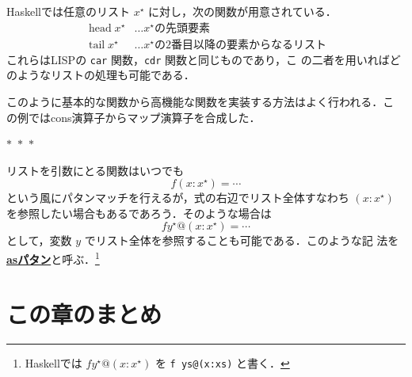 \documentclass[a5paper,twoside,fleqn,draft]{jsbook}
\newcommand{\separator}{\begin{center}$*$~$*$~$*$\end{center}}
\newcommand{\programminglanguage}[1]{\textsf{#1}}
\newcommand{\haskell}{\programminglanguage{Haskell}}
\newcommand{\lisp}{\programminglanguage{LISP}}
\newcommand{\keyword}[1]{{\underline{\textbf{#1}}}}
\newcommand{\code}[1]{\texttt{#1}}
\newcommand{\mSpecialFunc}[1]{\mathrm{#1}}
\DeclareMathOperator{\mHead}{\mSpecialFunc{head}}
\DeclareMathOperator{\mTail}{\mSpecialFunc{tail}}
\newcommand{\mList}[1]{{#1}^\mathrm{\star}}
\begin{document}
\haskell では任意のリスト $\mList{x}$ に対し，次の関数が用意されている．
\begin{align*}
\mHead\mList{x}&\dots\text{$\mList{x}$の先頭要素}\\
\mTail\mList{x}&\dots\text{$\mList{x}$の2番目以降の要素からなるリスト}
\end{align*}
これらは\lisp の \code{car} 関数，\code{cdr} 関数と同じものであり，こ
の二者を用いればどのようなリストの処理も可能である．

このように基本的な関数から高機能な関数を実装する方法はよく行われる．こ
の例ではcons演算子からマップ演算子を合成した．

\separator

リストを引数にとる関数はいつでも
\begin{equation}
f(x:\mList{x})=\dotsb
\end{equation}
という風にパタンマッチを行えるが，式の右辺でリスト全体すなわち
$(x:\mList{x})$ を参照したい場合もあるであろう．そのような場合は
\begin{equation}
f\mList{y}@(x:\mList{x})=\dotsb
\end{equation}
として，変数 $y$ でリスト全体を参照することも可能である．このような記
法を\keyword{asパタン}と呼ぶ．\footnote{\haskell では
  $f\mList{y}@(x:\mList{x})$ を \code{f ys@(x:xs)} と書く．}

\section{この章のまとめ}
\end{document}
